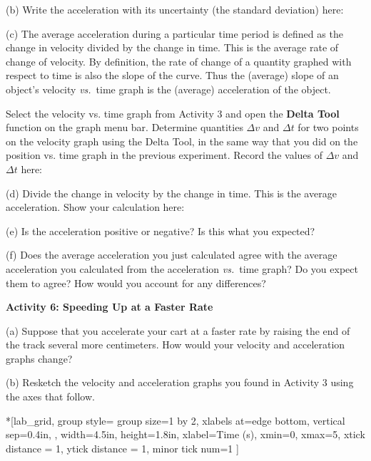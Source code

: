 (b) Write the acceleration with its uncertainty (the standard deviation) here:
\answerspace{20mm}

(c) The average acceleration during a particular time period is defined as the
change in velocity divided by the change in time. This is the average rate of
change of velocity. By definition, the rate of change of a quantity graphed
with respect to time is also the slope of the curve. Thus the (average) slope
of an object's velocity \textit{vs.}~time graph is the (average) acceleration of the
object.

Select the velocity vs. time graph from Activity 3 and open the \textbf{Delta Tool} function on the graph menu bar. Determine quantities \( \Delta v\) and \( \Delta t\) for two points on the velocity graph using the Delta Tool, 
in the same way that you did on the position vs. time graph in the previous experiment. Record the values of 
\( \Delta v\) and \( \Delta t\) here:
\answerspace{20mm}

(d) Divide the change in velocity by the change in time. This is the average acceleration. Show your calculation here:
\answerspace{20mm}

\pagebreak[2]
(e) Is the acceleration positive or negative? Is this what you expected? 
\answerspace{15mm}

(f) Does the average acceleration you just calculated agree with the average
acceleration you calculated from the acceleration \textit{vs.}~time graph? Do you expect them to agree? How would you account for any differences? 
\answerspace{20mm}

\textbf{Activity 6: Speeding Up at a Faster Rate} 

(a) Suppose that you accelerate your cart at a faster rate by raising the end of the track several more centimeters. How would your velocity and acceleration graphs change? 
\answerspace{15mm}

(b) Resketch the velocity and acceleration graphs you found in Activity 3 using
the axes that follow.


\begin{lab_groupplot}*{}[lab_grid,
	group style={
		group size=1 by 2,
		xlabels at=edge bottom,
		vertical sep=0.4in,
		},
	width=4.5in,  height=1.8in,
	xlabel=Time (s),
	xmin=0, xmax=5,
	xtick distance = 1, 
	ytick distance = 1, 
	minor tick num=1
	]
\nextgroupplot[
	ymin=-1,ymax=1, 
	ylabel={Velocity (m/s)},
	]
\nextgroupplot[
	ymin=-1,ymax=1, 
	ylabel={Acceleration (m/s$^2$)},
	]
\end{lab_groupplot}

